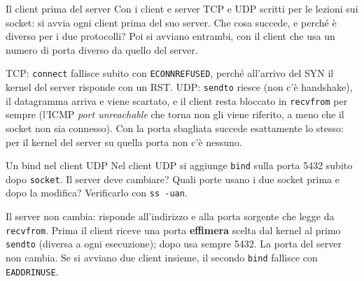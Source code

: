 \begin{esercizio}{Il client prima del server}
Con i client e server TCP e UDP scritti per le lezioni sui socket: si avvia ogni client prima del suo server. Che cosa succede, e perché
è diverso per i due protocolli? Poi si avviano entrambi, con il client che usa un numero di porta diverso da quello del server.

\svolgimento
TCP: \texttt{connect} fallisce subito con \texttt{ECONNREFUSED}, perché all'arrivo del SYN il kernel del server risponde con un RST.
UDP: \texttt{sendto} riesce (non c'è handshake), il datagramma arriva e viene scartato, e il client resta bloccato in \texttt{recvfrom}
per sempre (l'ICMP \emph{port unreachable} che torna non gli viene riferito, a meno che il socket non sia connesso). Con la porta
sbagliata succede esattamente lo stesso: per il kernel del server su quella porta non c'è nessuno.
\end{esercizio}

\begin{esercizio}{Un bind nel client UDP}
Nel client UDP si aggiunge \texttt{bind} sulla porta 5432 subito dopo \texttt{socket}. Il server deve cambiare? Quali porte usano i due
socket prima e dopo la modifica? Verificarlo con \texttt{ss -uan}.

\svolgimento
Il server non cambia: risponde all'indirizzo e alla porta sorgente che legge da \texttt{recvfrom}. Prima il client riceve una porta
\textbf{effimera} scelta dal kernel al primo \texttt{sendto} (diversa a ogni esecuzione); dopo usa sempre 5432. La porta del server non
cambia. Se si avviano due client insieme, il secondo \texttt{bind} fallisce con \texttt{EADDRINUSE}.
\end{esercizio}

